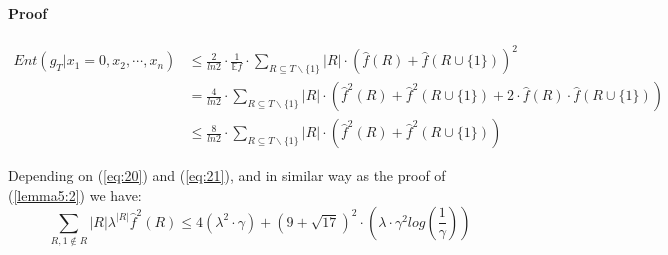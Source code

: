 \documentclass{article}
\begin{document}
			\paragraph{Proof}
				\begin{equation} \label{entGtX0} \begin{aligned}
					Ent \left( g_T | x_1 = 0,x_2, \cdots, x_n \right) 
					& \leq \frac{2}{ln 2} \cdot \frac{1}{\mathbb{E} f} \cdot \sum_{R \subseteq {T\backslash \{1\}}} |R| \cdot \left( \hat{f} (R) + \hat{f} (R \cup \{1\}) \right)^2 \\ 
					& = \frac{4}{ln 2} \cdot \sum_{R \subseteq {T\backslash \{1\}}} |R| \cdot \left( \hat{f}^2 (R) + \hat{f}^2 (R \cup \{1\}) + 2 \cdot \hat{f}(R)  \cdot \hat{f} (R \cup \{1\}) \right) \\ 
					& \leq \frac{8}{ln 2} \cdot \sum_{R \subseteq {T\backslash \{1\}}} |R| \cdot \left( \hat{f}^2 (R) + \hat{f}^2 (R \cup \{1\}) \right)
				\end{aligned}
				\end{equation}
				    
				Depending on (\ref{eq:20}) and (\ref{eq:21}), and in similar way as the proof of (\ref{lemma5:2}) we have:
				\begin{equation}
					\sum_{R, 1 \notin R} |R| \lambda^{|R|} \hat{f}^2(R) \leq 4 ( \lambda^2 \cdot \gamma ) + \left( 9 + \sqrt{17} \right)^2 \cdot \left( \lambda \cdot \gamma^2 log \left( \frac{1}{\gamma} \right) \right)
				\end{equation}
			
\end{document}
